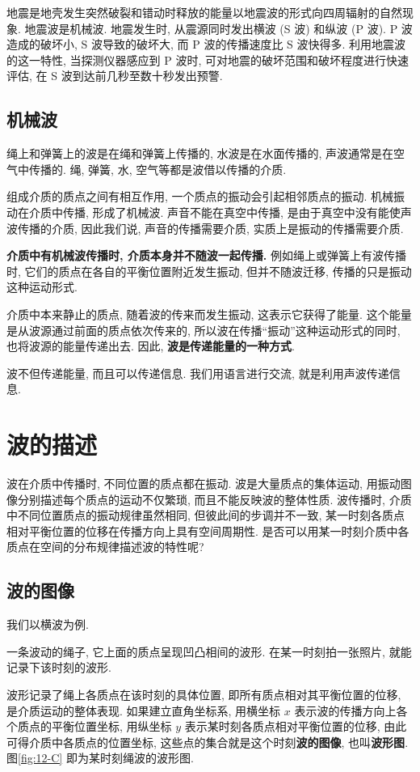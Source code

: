 \documentclass[UTF8,openany,fontset=fandol]{ctexbook}
\theoremstyle{chinesetextbook}
\begin{document}
{\kaishu 地震是地壳发生突然破裂和错动时释放的能量以地震波的形式向四周辐射的自然现象. 地震波是机械波. 地震发生时, 从震源同时发出横波 (S 波) 和纵波 (P 波). P 波造成的破坏小, S 波导致的破坏大, 而 P 波的传播速度比 S 波快得多. 利用地震波的这一特性, 当探测仪器感应到 P 波时, 可对地震的破坏范围和破坏程度进行快速评估, 在 S 波到达前几秒至数十秒发出预警.}
\subsection{机械波}
绳上和弹簧上的波是在绳和弹簧上传播的, 水波是在水面传播的, 声波通常是在空气中传播的. 绳, 弹簧, 水, 空气等都是波借以传播的介质.

组成介质的质点之间有相互作用, 一个质点的振动会引起相邻质点的振动. 机械振动在介质中传播, 形成了机械波. 声音不能在真空中传播, 是由于真空中没有能使声波传播的介质, 因此我们说, 声音的传播需要介质, 实质上是振动的传播需要介质.

\textbf{介质中有机械波传播时, 介质本身并不随波一起传播.} 例如绳上或弹簧上有波传播时, 它们的质点在各自的平衡位置附近发生振动, 但并不随波迁移, 传播的只是振动这种运动形式.

介质中本来静止的质点, 随着波的传来而发生振动, 这表示它获得了能量. 这个能量是从波源通过前面的质点依次传来的, 所以波在传播“振动”这种运动形式的同时, 也将波源的能量传递出去. 因此, \textbf{波是传递能量的一种方式}.

波不但传递能量, 而且可以传递信息. 我们用语言进行交流, 就是利用声波传递信息.
\section{波的描述}
波在介质中传播时, 不同位置的质点都在振动. 波是大量质点的集体运动, 用振动图像分别描述每个质点的运动不仅繁琐, 而且不能反映波的整体性质. 波传播时, 介质中不同位置质点的振动规律虽然相同, 但彼此间的步调并不一致, 某一时刻各质点相对平衡位置的位移在传播方向上具有空间周期性. 是否可以用某一时刻介质中各质点在空间的分布规律描述波的特性呢?
\subsection{波的图像}
我们以横波为例.

一条波动的绳子, 它上面的质点呈现凹凸相间的波形. 在某一时刻拍一张照片, 就能记录下该时刻的波形.

波形记录了绳上各质点在该时刻的具体位置, 即所有质点相对其平衡位置的位移, 是介质运动的整体表现. 如果建立直角坐标系, 用横坐标 $x$ 表示波的传播方向上各个质点的平衡位置坐标, 用纵坐标 $y$ 表示某时刻各质点相对平衡位置的位移, 由此可得介质中各质点的位置坐标, 这些点的集合就是这个时刻\textbf{波的图像}, 也叫\textbf{波形图}. 图\ref{fig:12-C} 即为某时刻绳波的波形图.
\end{document}
